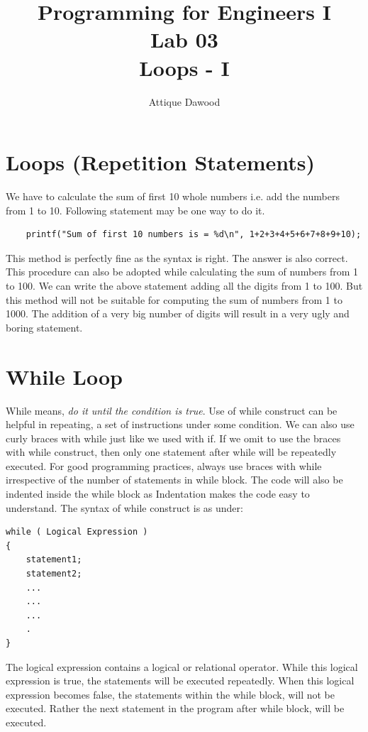 \documentclass[12pt,a4paper]{article}
\title{Programming for Engineers I\\Lab 03\\Loops - I}
\author{Attique Dawood}
\begin{document}
\maketitle

\section{Loops (Repetition Statements)}
We have to calculate the sum of first 10 whole numbers i.e. add the numbers from 1 to 10. Following statement may be one way to do it.
\begin{verbatim}
    printf("Sum of first 10 numbers is = %d\n", 1+2+3+4+5+6+7+8+9+10);
\end{verbatim}
This method is perfectly fine as the syntax is right. The answer is also correct. This procedure can also be adopted while calculating the sum of numbers from 1 to 100. We can write the above statement adding all the digits from 1 to 100. But this method will not be suitable for computing the sum of numbers from 1 to 1000. The addition of a very big number of digits will result in a very ugly and boring statement. 

\section{While Loop}
While means, \emph{do it until the condition is true}. Use of while construct can be helpful in repeating, a set of instructions under some condition. We can also use curly braces with while just like we used with if. If we omit to use the braces with while construct, then only one statement after while will be repeatedly executed. For good programming practices, always use braces with while irrespective of the number of statements in while block. The code will also be indented inside the while block as Indentation makes the code easy to understand. 
The syntax of while construct is as under:
\begin{verbatim}
while ( Logical Expression )
{
    statement1;
    statement2;
    ...
    ...
    ...
    .
}
\end{verbatim}
The logical expression contains a logical or relational operator. While this logical expression is true, the statements will be executed repeatedly. When this logical expression becomes false, the statements within the while block, will not be executed. Rather the next statement in the program after while block, will be executed. 
\end{document}
